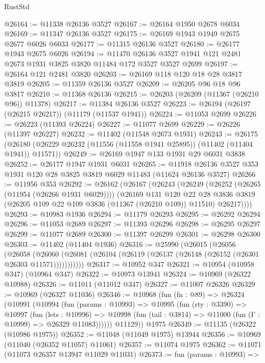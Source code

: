 \begin{lexlean}{RustStd}
\begin{coremodule}
@26164 := @11338 @26136 @3527
@26167 := @26164 @1950 @2678 @6034
@26169 := @11347 @26136 @3527
@26175 := @26169 @1943 @1949 @2675 @2677 @6026 @6033
@26177 := @11315 @26136 @3527
@26180 := @26177 @1943 @2675 @6026
@26194 := @11470 @26136 @3527 @1941 @121 @2481 @2673 @1931 @3825 @3820 @11484 @172 @3527 @3527 @2699
@26197 := @26164 @121 @2481 @3820
@26203 := @26169 @118 @120 @18 @28 @3817 @3819
@26205 := @11359 @26136 @3527
@26209 := @26205 @96 @18 @96 @3817
@26210 := @11368 @26136
@26215 := @26203 (@26209 (@11367 (@26210 @96)) @11378)
@26217 := @11384 @26136 @3527
@26223 := @26194 (@26197 (@26215 @26217)) (@11179 (@11537 @1941))
@26224 := @11053 @2699
@26226 := @26223 (@11393 @26224)
@26227 := @11077 @2699
@26229 := @26226 (@11397 @26227)
@26232 := @11402 (@11548 @2673 @1931)
@26243 := @26175
    (@26180 (@26229 @26232 (@11556 (@11558 @1941 @25895)) (@11402 (@11404 @1941)) @11571))
@26249 := @26169 @1947 @133 @1931 @29 @6031 @3838
@26252 := @26177 @1947 @1931 @6031
@26265 := @11918 @26136 @3527 @353 @1931 @120 @28 @3825 @3819 @6029 @11483 (@11624 @26136 @3527)
@26266 := @11956 @353
@26292 := @26162
    (@26167
      (@26243
        (@26249
          (@26252 (@26265 (@11954 (@26266 @1931 @6029))))
          (@26169
            @131
            @120
            @22
            @28
            @3836
            @3819
            (@26205 @109 @22 @109 @3836 (@11367 (@26210 @109)) @11510)
            @26217))))
@26293 := @10983 @1936
@26294 := @11179 @26293
@26295 := @26292 @26294
@26296 := @11053 @2689
@26297 := @11393 @26296
@26298 := @26295 @26297
@26299 := @11077 @2689
@26300 := @11397 @26299
@26301 := @26298 @26300
@26303 := @11402 (@11404 @1936)
@26316 := @25990
    (@26015
      (@26056
        (@26058
          (@26060 (@26081 (@26104 (@26119 (@26137 (@26148 (@26152 (@26301 @26303 @11571)))))))))))
@26317 := @10952 @347
@26321 := @10954 (@10958 @347) (@10964 @347)
@26322 := @10973 @13941
@26324 := @10969 (@26322 @10988)
@26326 := @11011 (@11012 @347)
@26327 := @11007 @26326
@26329 := @10969 (@26327 @11036)
@26346 := @10968
    (fun (fn : @89) =>
    @26324
      (@10991
        (@10994
          (fun (params : @10993) =>
          @10995
            (fun (rty : @3390) =>
            @10997
              (fun (lets : @10996) =>
              @10998 (fun (tail : @3814) => @11000 (fun (Γ : @10999) => @26329 @11083))))))
        @11129))
    @1975
@26349 := @11135 (@26322 (@10986 @1975))
@26352 := @11048 (@11049 @1975) @13944
@26356 := @10969 (@11040 (@26352 @11057) @11061)
@26357 := @11074 @1975
@26362 := @11071 (@11073 @26357 @13947 @11029 @11031)
@26373 := fun (params : @10993) =>

\end{coremodule}
\end{lexlean}
